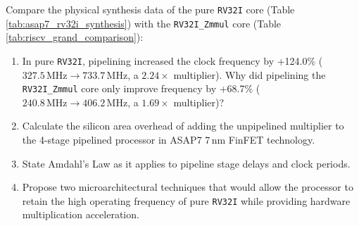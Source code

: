 \begin{problem}
Compare the physical synthesis data of the pure \texttt{RV32I} core (Table \ref{tab:asap7_rv32i_synthesis}) with the \texttt{RV32I\_Zmmul} core (Table \ref{tab:riscv_grand_comparison}):
\begin{enumerate}
    \item In pure \texttt{RV32I}, pipelining increased the clock frequency by +124.0\% ($327.5\,\text{MHz} \to 733.7\,\text{MHz}$, a $2.24\times$ multiplier). Why did pipelining the \texttt{RV32I\_Zmmul} core only improve frequency by +68.7\% ($240.8\,\text{MHz} \to 406.2\,\text{MHz}$, a $1.69\times$ multiplier)?
    \item Calculate the silicon area overhead of adding the unpipelined multiplier to the 4-stage pipelined processor in ASAP7 7\,nm FinFET technology.
    \item State Amdahl's Law as it applies to pipeline stage delays and clock periods.
    \item Propose two microarchitectural techniques that would allow the processor to retain the high operating frequency of pure \texttt{RV32I} while providing hardware multiplication acceleration.
\end{enumerate}


\end{problem}
